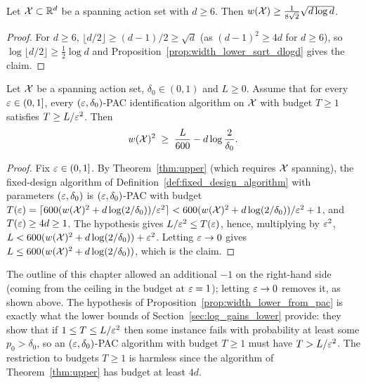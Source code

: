 \begin{corollary}\label{cor:width_lower_sqrt_dlogd}
Let $\mathcal{X} \subset \mathbb{R}^d$ be a spanning action set with $d \ge 6$. Then
$w(\mathcal{X}) \ge \frac{1}{8\sqrt 2}\sqrt{d\log d}$.
\end{corollary}
\begin{proof}
For $d \ge 6$, $\lfloor d/2\rfloor \ge (d-1)/2 \ge \sqrt d$ (as $(d-1)^2 \ge 4d$ for $d \ge 6$), so
$\log\lfloor d/2\rfloor \ge \frac12\log d$ and Proposition~\ref{prop:width_lower_sqrt_dlogd} gives
the claim.
\end{proof}


\begin{proposition}\label{prop:width_lower_from_pac}
Let $\mathcal{X}$ be a spanning action set, $\delta_0 \in (0,1)$ and $L \ge 0$. Assume that for every
$\varepsilon \in (0,1]$, every $(\varepsilon,\delta_0)$-PAC identification algorithm on $\mathcal{X}$ with budget
$T \ge 1$ satisfies $T \ge L/\varepsilon^2$. Then
\[
  w(\mathcal{X})^2 \;\ge\; \frac{L}{600} - d\log\frac{2}{\delta_0}.
\]
\end{proposition}

\begin{proof}
Fix $\varepsilon \in (0,1]$. By Theorem~\ref{thm:upper} (which requires $\mathcal{X}$ spanning), the
fixed-design algorithm of
Definition~\ref{def:fixed_design_algorithm} with parameters $(\varepsilon, \delta_0)$ is
$(\varepsilon,\delta_0)$-PAC with budget
$T(\varepsilon) = \lceil 600(w(\mathcal{X})^2 + d\log(2/\delta_0))/\varepsilon^2\rceil
< 600(w(\mathcal{X})^2 + d\log(2/\delta_0))/\varepsilon^2 + 1$, and $T(\varepsilon) \ge 4d \ge 1$. The hypothesis gives
$L/\varepsilon^2 \le T(\varepsilon)$, hence, multiplying by $\varepsilon^2$,
$L < 600(w(\mathcal{X})^2 + d\log(2/\delta_0)) + \varepsilon^2$. Letting $\varepsilon \to 0$ gives
$L \le 600(w(\mathcal{X})^2 + d\log(2/\delta_0))$, which is the claim.
\end{proof}

\begin{remark}
The outline of this chapter allowed an additional $-1$ on the right-hand side (coming from
the ceiling in the budget at $\varepsilon = 1$); letting $\varepsilon \to 0$ removes it, as shown above.
The hypothesis of Proposition~\ref{prop:width_lower_from_pac} is exactly what the lower
bounds of Section~\ref{sec:log_gains_lower} provide: they show that if
$1 \le T \le L/\varepsilon^2$ then some instance fails with probability at least some $p_0 > \delta_0$,
so an $(\varepsilon,\delta_0)$-PAC algorithm with budget $T \ge 1$ must have $T > L/\varepsilon^2$. The
restriction to budgets $T \ge 1$ is harmless since the algorithm of Theorem~\ref{thm:upper}
has budget at least $4d$.
\end{remark}


